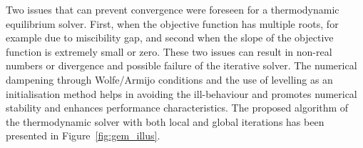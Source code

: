 	Two issues that can prevent convergence were foreseen for a thermodynamic equilibrium solver. First, when the objective function has multiple roots, for example due to miscibility gap, and second when the slope of the objective function is extremely small or zero. These two issues can result in non-real numbers or divergence and possible failure of the iterative solver.
The numerical dampening through Wolfe/Armijo conditions and the use of levelling as an initialisation method helps in avoiding the ill-behaviour and promotes numerical stability and enhances performance characteristics. The proposed algorithm of the thermodynamic solver with both local and global iterations has been presented in Figure~\ref{fig:gem_illus}.
\begin{landscape}
\thispagestyle{empty}


\end{landscape}
